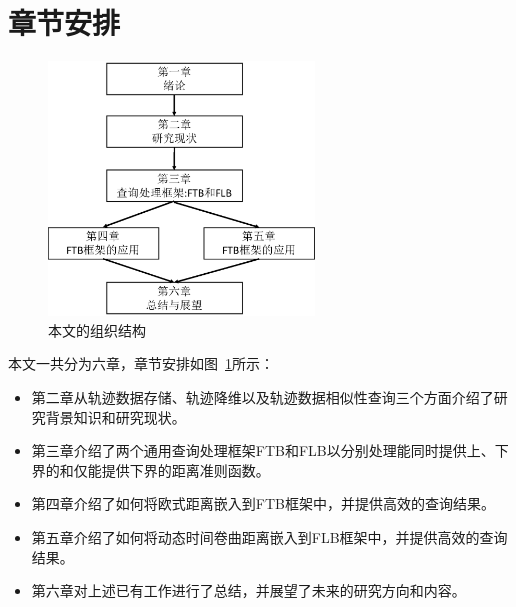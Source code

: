 \section{章节安排}
\begin{figure}
	\centering
	\includegraphics[width=0.63\textwidth]{Fig/chapter1/paperStructure}
	\caption{本文的组织结构}
	\label{fig-chapter1-structure}
\end{figure}
本文一共分为六章，章节安排如图~\ref{fig-chapter1-structure}所示：
\begin{itemize}
	\item 第二章从轨迹数据存储、轨迹降维以及轨迹数据相似性查询三个方面介绍了研究背景知识和研究现状。
	\item 第三章介绍了两个通用查询处理框架FTB和FLB以分别处理能同时提供上、下界的和仅能提供下界的距离准则函数。
	\item 第四章介绍了如何将欧式距离嵌入到FTB框架中，并提供高效的查询结果。
	\item 第五章介绍了如何将动态时间卷曲距离嵌入到FLB框架中，并提供高效的查询结果。
	\item 第六章对上述已有工作进行了总结，并展望了未来的研究方向和内容。
\end{itemize}

\clearpage
\phantom{s}
\clearpage